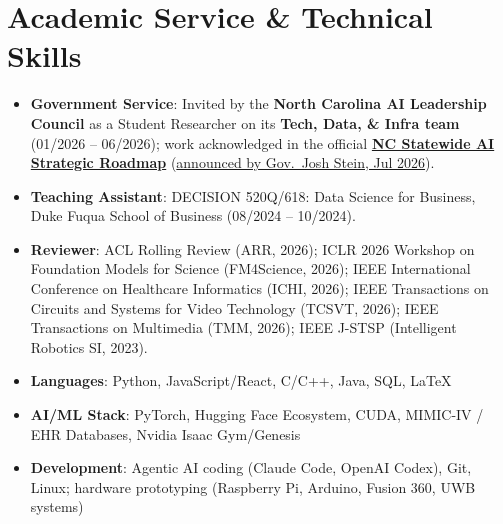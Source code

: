 \documentclass[a4paper,11pt]{article}
\begin{document}
\vspace{-1mm}
\section{\textbf{Academic Service \& Technical Skills}}
\begin{itemize}[leftmargin=0.05in, label={}, nosep]
    \footnotesize
  \item \textbf{Government Service}: Invited by the \textbf{North Carolina AI Leadership Council} as a Student Researcher on its \textbf{Tech, Data, \& Infra team} (01/2026 -- 06/2026); work acknowledged in the official \href{https://it.nc.gov/documents/statewide-ai-strategic-roadmap/open}{\textbf{NC Statewide AI Strategic Roadmap}} (\href{https://www.commerce.nc.gov/news/press-releases/2026/07/01/governor-stein-announces-ai-strategic-roadmap-protect-and-better-serve-north-carolinians-prepare}{announced by Gov.\ Josh Stein, Jul 2026}).
  \item \textbf{Teaching Assistant}: DECISION 520Q/618: Data Science for Business, Duke Fuqua School of Business (08/2024 -- 10/2024).
  \item \textbf{Reviewer}: ACL Rolling Review (ARR, 2026); ICLR 2026 Workshop on Foundation Models for Science (FM4Science, 2026); IEEE International Conference on Healthcare Informatics (ICHI, 2026); IEEE Transactions on Circuits and Systems for Video Technology (TCSVT, 2026); IEEE Transactions on Multimedia (TMM, 2026); IEEE J-STSP (Intelligent Robotics SI, 2023).
  \item \textbf{Languages}: Python, JavaScript/React, C/C++, Java, SQL, \LaTeX
  \item \textbf{AI/ML Stack}: PyTorch, Hugging Face Ecosystem, CUDA, MIMIC-IV / EHR Databases, Nvidia Isaac Gym/Genesis
  \item \textbf{Development}: Agentic AI coding (Claude Code, OpenAI Codex), Git, Linux; hardware prototyping (Raspberry Pi, Arduino, Fusion 360, UWB systems)
\end{itemize}
\end{document}

